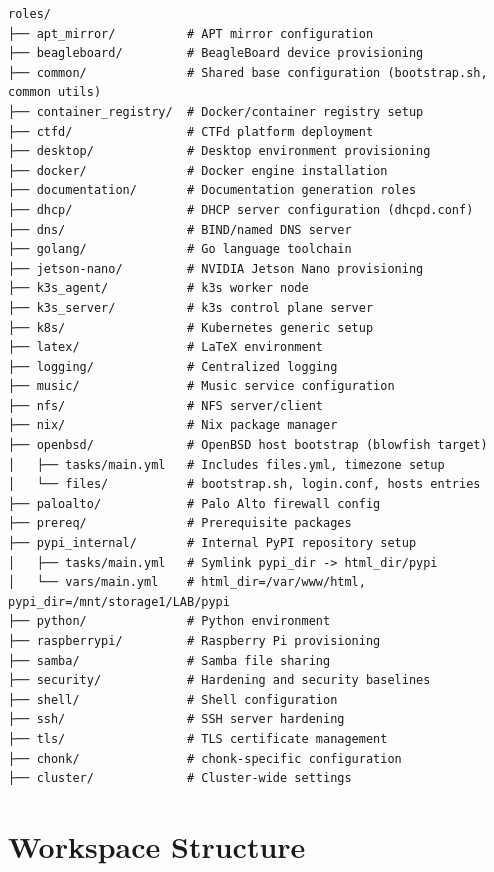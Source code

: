 \begin{lstlisting}[style=mystyle]
roles/
├── apt_mirror/          # APT mirror configuration
├── beagleboard/         # BeagleBoard device provisioning
├── common/              # Shared base configuration (bootstrap.sh, common utils)
├── container_registry/  # Docker/container registry setup
├── ctfd/                # CTFd platform deployment
├── desktop/             # Desktop environment provisioning
├── docker/              # Docker engine installation
├── documentation/       # Documentation generation roles
├── dhcp/                # DHCP server configuration (dhcpd.conf)
├── dns/                 # BIND/named DNS server
├── golang/              # Go language toolchain
├── jetson-nano/         # NVIDIA Jetson Nano provisioning
├── k3s_agent/           # k3s worker node
├── k3s_server/          # k3s control plane server
├── k8s/                 # Kubernetes generic setup
├── latex/               # LaTeX environment
├── logging/             # Centralized logging
├── music/               # Music service configuration
├── nfs/                 # NFS server/client
├── nix/                 # Nix package manager
├── openbsd/             # OpenBSD host bootstrap (blowfish target)
│   ├── tasks/main.yml   # Includes files.yml, timezone setup
│   └── files/           # bootstrap.sh, login.conf, hosts entries
├── paloalto/            # Palo Alto firewall config
├── prereq/              # Prerequisite packages
├── pypi_internal/       # Internal PyPI repository setup
│   ├── tasks/main.yml   # Symlink pypi_dir -> html_dir/pypi
│   └── vars/main.yml    # html_dir=/var/www/html, pypi_dir=/mnt/storage1/LAB/pypi
├── python/              # Python environment
├── raspberrypi/         # Raspberry Pi provisioning
├── samba/               # Samba file sharing
├── security/            # Hardening and security baselines
├── shell/               # Shell configuration
├── ssh/                 # SSH server hardening
├── tls/                 # TLS certificate management
├── chonk/               # chonk-specific configuration
├── cluster/             # Cluster-wide settings
    \end{lstlisting}

\section{Workspace Structure}

